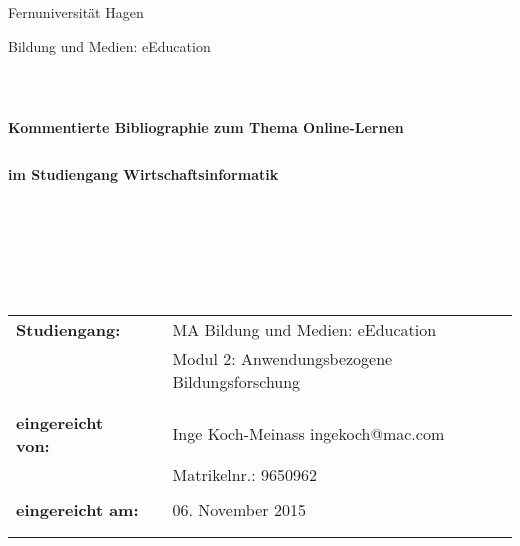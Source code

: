 \documentclass[12pt, bibliography=totoc]{scrartcl}
\begin{document}
  \begin{titlepage}
  \thispagestyle{empty}
  \begin{center}
  \color{blue}\Large{Fernuniversität Hagen}\\
  \end{center}


  \begin{center}
  \Large{Bildung und Medien: eEducation}
  \end{center}
  \begin{verbatim}



  \end{verbatim}
  \begin{center}
  \textbf{\Large{Kommentierte Bibliographie zum Thema Online-Lernen}}
  \end{center}
  \begin{verbatim}

  \end{verbatim}
  \begin{center}
  \textbf{im Studiengang Wirtschaftsinformatik}
  \end{center}
  \begin{verbatim}







  \end{verbatim}

  \begin{flushleft}
  \begin{tabular}{lll}
  \textbf{Studiengang:} & & MA Bildung und Medien: eEducation\\
  & & Modul 2: Anwendungsbezogene Bildungsforschung\\
  & & \\
  & & \\
  \textbf{eingereicht von:} & & {\color{magenta} Inge Koch-Meinass \flq{}ingekoch@mac.com\frq{}}\\
  & & {\color{magenta}Matrikelnr.: 9650962 }\\
  & & \\
  \textbf{eingereicht am:} & & 06. November 2015\\
  & & \\
  & & \\
  \end{tabular}
  \end{flushleft}

  \end{titlepage}
\end{document}
